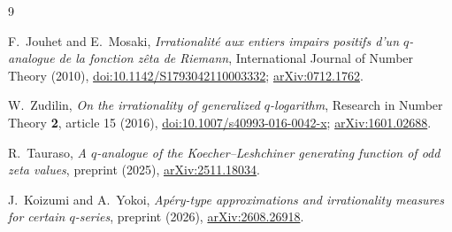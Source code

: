 \documentclass[11pt]{article}
\theoremstyle{remark}
\begin{document}
\begin{thebibliography}{9}

F.~Jouhet and E.~Mosaki,
\emph{Irrationalit\'e aux entiers impairs positifs d'un
$q$-analogue de la fonction z\^eta de Riemann},
International Journal of Number Theory (2010),
\href{https://doi.org/10.1142/S1793042110003332}{doi:10.1142/S1793042110003332};
\href{https://arxiv.org/abs/0712.1762}{arXiv:0712.1762}.

W.~Zudilin,
\emph{On the irrationality of generalized $q$-logarithm},
Research in Number Theory \textbf{2}, article 15 (2016),
\href{https://doi.org/10.1007/s40993-016-0042-x}{doi:10.1007/s40993-016-0042-x};
\href{https://arxiv.org/abs/1601.02688}{arXiv:1601.02688}.

R.~Tauraso,
\emph{A $q$-analogue of the Koecher--Leshchiner generating function
of odd zeta values}, preprint (2025),
\href{https://arxiv.org/abs/2511.18034}{arXiv:2511.18034}.

J.~Koizumi and A.~Yokoi,
\emph{Ap\'ery-type approximations and irrationality measures for
certain $q$-series}, preprint (2026),
\href{https://arxiv.org/abs/2608.26918}{arXiv:2608.26918}.

\end{thebibliography}
\end{document}
